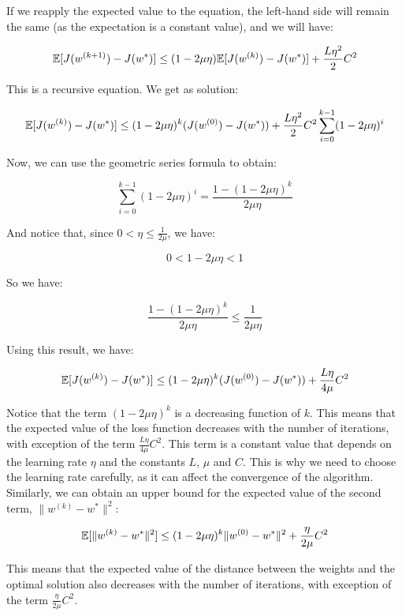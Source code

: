 If we reapply the expected value to the equation, the left-hand side will remain the same (as
the expectation is a constant value), and we will have:

$$\mathbb{E}[J(w^{(k+1)}) - J(w^*)] \leq (1 - 2 \mu \eta) \mathbb{E}[J(w^{(k)}) - J(w^*)] + \frac{L \eta^2}{2} C^2$$

This is a recursive equation. We get as solution:

$$\mathbb{E}[J(w^{(k)}) - J(w^*)] \leq (1 - 2 \mu \eta)^k (J(w^{(0)}) - J(w^*)) + \frac{L \eta^2}{2} C^2 \sum_{i=0}^{k-1} (1 - 2 \mu \eta)^i$$

Now, we can use the geometric series formula to obtain:

$$\sum_{i=0}^{k-1} (1 - 2 \mu \eta)^i = \frac{1 - (1 - 2 \mu \eta)^k}{2 \mu \eta}$$

And notice that, since $0 < \eta \leq \frac{1}{2 \mu}$, we have:

$$0 < 1 - 2 \mu \eta < 1$$

So we have:

$$ \frac{1 - (1 - 2 \mu \eta)^k}{2 \mu \eta} \leq \frac{1}{2 \mu \eta}$$

Using this result, we have:

\begin{equation}
    \mathbb{E}[J(w^{(k)}) - J(w^*)] \leq (1 - 2 \mu \eta)^k (J(w^{(0)}) - J(w^*)) + \frac{L \eta}{4 \mu} C^2
\end{equation}

Notice that the term $(1 - 2 \mu \eta)^k$ is a decreasing function of $k$. This means that the
expected value of the loss function decreases with the number of iterations, with
exception of the term $\frac{L \eta}{4 \mu} C^2$. This term is a constant value that depends on
the learning rate $\eta$ and the constants $L$, $\mu$ and $C$. This is why we need to choose the
learning rate carefully, as it can affect the convergence of the algorithm.\\

Similarly, we can obtain an upper bound for the expected value of the second term, 
$\|w^{(k)} - w^*\|^2$:

\begin{equation}
    \mathbb{E}[\|w^{(k)} - w^*\|^2] \leq (1 - 2 \mu \eta)^k \|w^{(0)} - w^*\|^2 + \frac{\eta}{2\mu} C^2
\end{equation}

This means that the expected value of the distance between the weights and the optimal solution
also decreases with the number of iterations, with exception of the term $\frac{\eta}{2\mu} C^2$.\\

